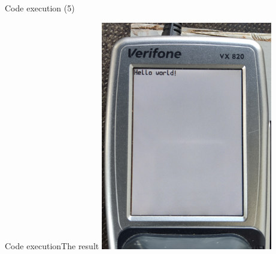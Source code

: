 \documentclass[12pt,aspectratio=169]{beamer}
\begin{document}
\begin{frame}{Code execution (5)}
\vspace{-1.5mm}
\end{frame}

\begin{frame}{Code execution}{The result}
\centering
\includegraphics[height=10cm]{media/vx820_hello_world}
\end{frame}
\end{document}
